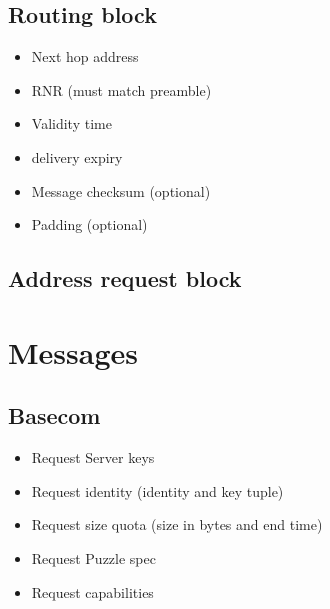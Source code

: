 \subsection{Routing block}
\begin{itemize}
  \item Next hop address
  \item RNR (must match preamble)
  \item Validity time
  \item delivery expiry
  \item Message checksum (optional)
  \item Padding  (optional)
\end{itemize}

\subsection{Address request block}

\section{Messages}
\subsection{Basecom}
\begin{itemize}
  \item Request Server keys
  \item Request identity (identity and key tuple)
  \item Request size quota (size in bytes and end time)
  \item Request Puzzle spec
  \item Request capabilities
\end{itemize}
